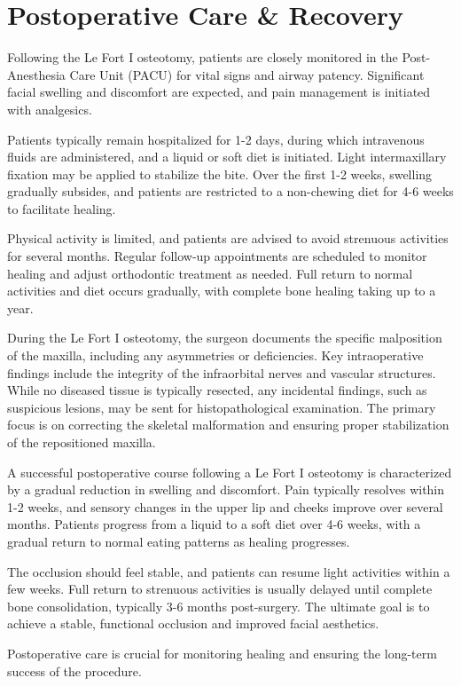 \section*{Postoperative Care \& Recovery}
Following the Le Fort I osteotomy, patients are closely monitored in the Post-Anesthesia Care Unit (PACU) for vital signs and airway patency. Significant facial swelling and discomfort are expected, and pain management is initiated with analgesics. 

Patients typically remain hospitalized for 1-2 days, during which intravenous fluids are administered, and a liquid or soft diet is initiated. Light intermaxillary fixation may be applied to stabilize the bite. Over the first 1-2 weeks, swelling gradually subsides, and patients are restricted to a non-chewing diet for 4-6 weeks to facilitate healing. 

Physical activity is limited, and patients are advised to avoid strenuous activities for several months. Regular follow-up appointments are scheduled to monitor healing and adjust orthodontic treatment as needed. Full return to normal activities and diet occurs gradually, with complete bone healing taking up to a year.

During the Le Fort I osteotomy, the surgeon documents the specific malposition of the maxilla, including any asymmetries or deficiencies. Key intraoperative findings include the integrity of the infraorbital nerves and vascular structures. While no diseased tissue is typically resected, any incidental findings, such as suspicious lesions, may be sent for histopathological examination. The primary focus is on correcting the skeletal malformation and ensuring proper stabilization of the repositioned maxilla.

A successful postoperative course following a Le Fort I osteotomy is characterized by a gradual reduction in swelling and discomfort. Pain typically resolves within 1-2 weeks, and sensory changes in the upper lip and cheeks improve over several months. Patients progress from a liquid to a soft diet over 4-6 weeks, with a gradual return to normal eating patterns as healing progresses. 

The occlusion should feel stable, and patients can resume light activities within a few weeks. Full return to strenuous activities is usually delayed until complete bone consolidation, typically 3-6 months post-surgery. The ultimate goal is to achieve a stable, functional occlusion and improved facial aesthetics.

Postoperative care is crucial for monitoring healing and ensuring the long-term success of the procedure.

